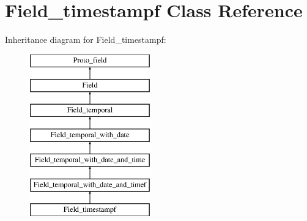 \hypertarget{classField__timestampf}{}\section{Field\+\_\+timestampf Class Reference}
\label{classField__timestampf}
Inheritance diagram for Field\+\_\+timestampf\+:\begin{figure}[H]
\begin{center}
\leavevmode
\includegraphics[height=7.000000cm]{classField__timestampf}
\end{center}
\end{figure}
